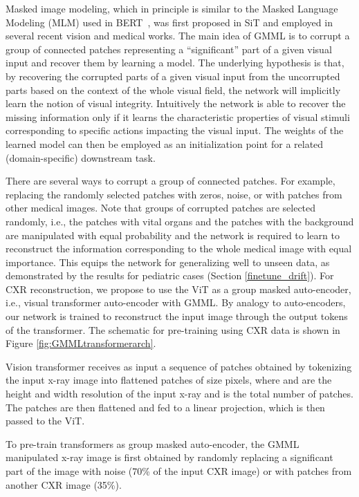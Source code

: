 \documentclass[10pt,journal,compsoc]{IEEEtran}
\begin{document}
Masked image modeling, which in principle is similar to the Masked Language Modeling (MLM) used in BERT~\cite{devlin2018bert}, was first proposed in SiT \cite{atito2021sit} and employed in several recent vision \cite{bao2021beit,atito2021mc,xie2022simmim} and medical \cite{atito2022sb,chen2022masked} works. 
The main idea of GMML is to corrupt a group of connected patches representing a ``significant'' part of a given visual input and recover them by learning a model. The underlying hypothesis is that, by recovering the corrupted parts of a given visual input from the uncorrupted parts based on the context of the whole visual field, the network will implicitly learn the notion of visual integrity. Intuitively the network is able to recover the missing information only if it learns the characteristic properties of visual stimuli corresponding to specific actions impacting the visual input. The weights of the learned model can then be employed as an initialization point for a related (domain-specific) downstream task. 

There are several ways to corrupt a group of connected patches. For example, replacing the randomly selected patches with zeros, noise, or with patches from other medical images. Note that groups of corrupted patches are selected randomly, i.e., the patches with vital organs and the patches with the background are manipulated with equal probability and the network is required to learn to reconstruct the information corresponding to the whole medical image with equal importance. This equips the network for generalizing well to unseen data, as demonstrated by the results for pediatric cases (Section \ref{finetune_drift}).
For CXR reconstruction, we propose to use the ViT as a group masked auto-encoder, i.e., visual transformer auto-encoder with GMML. By analogy to auto-encoders, our network is trained to reconstruct the input image through the output tokens of the transformer. The schematic for pre-training using CXR data is shown in Figure \ref{fig:GMMLtransformerarch}. 

Vision transformer receives as input a sequence of patches obtained by tokenizing the input x-ray image  into  flattened  patches of size  pixels, where  and  are the height and width resolution of the input x-ray and  is the total number of patches. The  patches are then flattened and fed to a linear projection, which is then passed to the ViT. 

To pre-train transformers as group masked auto-encoder, the GMML manipulated x-ray image  is first obtained by randomly replacing a significant part of the image with noise (70\% of the input CXR image) or with patches from another CXR image (35\%). 
\end{document}
